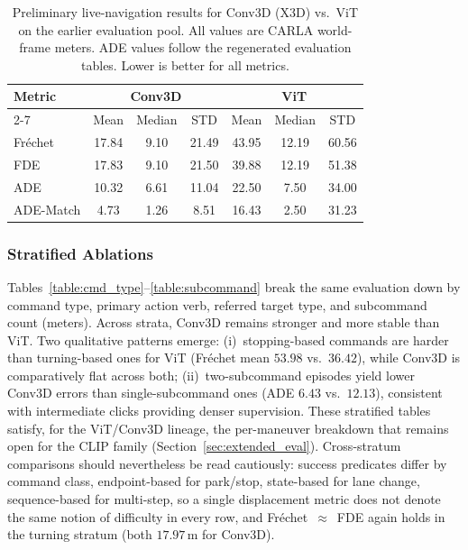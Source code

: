 \begin{table}[ht]
\begin{center}
\small
\begin{tabular}{|l|ccc|ccc|}
\hline
\multirow{2}{*}{Metric} & \multicolumn{3}{c|}{Conv3D} & \multicolumn{3}{c|}{ViT} \\ \cline{2-7}
 & Mean & Median & STD & Mean & Median & STD \\ \hline
Fr\'{e}chet & 17.84 & 9.10 & 21.49 & 43.95 & 12.19 & 60.56 \\
FDE & 17.83 & 9.10 & 21.50 & 39.88 & 12.19 & 51.38 \\
ADE & 10.32 & 6.61 & 11.04 & 22.50 & 7.50 & 34.00 \\
ADE-Match & 4.73 & 1.26 & 8.51 & 16.43 & 2.50 & 31.23 \\ \hline
\end{tabular}
\end{center}
\caption{Preliminary live-navigation results for Conv3D (X3D) vs.\ ViT on the earlier evaluation pool. All values are CARLA world-frame meters. ADE values follow the regenerated evaluation tables. Lower is better for all metrics.}
\label{table:conv3d_vit}
\end{table}

\subsubsection{Stratified Ablations}

Tables~\ref{table:cmd_type}--\ref{table:subcommand} break the same evaluation down by command type, primary action verb, referred target type, and subcommand count (meters). Across strata, Conv3D remains stronger and more stable than ViT. Two qualitative patterns emerge: (i)~stopping-based commands are harder than turning-based ones for ViT (Fr\'{e}chet mean $53.98$ vs.\ $36.42$), while Conv3D is comparatively flat across both; (ii)~two-subcommand episodes yield lower Conv3D errors than single-subcommand ones (ADE $6.43$ vs.\ $12.13$), consistent with intermediate clicks providing denser supervision. These stratified tables satisfy, for the ViT/Conv3D lineage, the per-maneuver breakdown that remains open for the CLIP family (Section~\ref{sec:extended_eval}). Cross-stratum comparisons should nevertheless be read cautiously: success predicates differ by command class, endpoint-based for park/stop, state-based for lane change, sequence-based for multi-step, so a single displacement metric does not denote the same notion of difficulty in every row, and Fr\'{e}chet~$\approx$~FDE again holds in the turning stratum (both $17.97\,\mathrm{m}$ for Conv3D).


